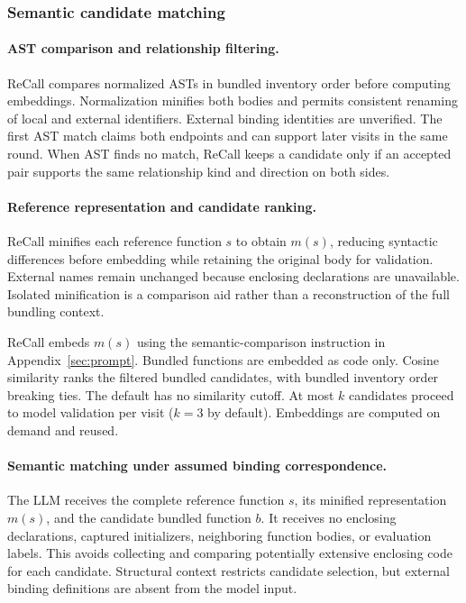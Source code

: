 \subsubsection{Semantic candidate matching}
\paragraph{AST comparison and relationship filtering.}
ReCall compares normalized ASTs in bundled inventory order before computing embeddings. Normalization minifies both bodies and permits consistent renaming of local and external identifiers. External binding identities are unverified. The first AST match claims both endpoints and can support later visits in the same round. When AST finds no match, ReCall keeps a candidate only if an accepted pair supports the same relationship kind and direction on both sides.

\paragraph{Reference representation and candidate ranking.}
ReCall minifies each reference function $s$ to obtain $m(s)$, reducing syntactic differences before embedding while retaining the original body for validation. External names remain unchanged because enclosing declarations are unavailable. Isolated minification is a comparison aid rather than a reconstruction of the full bundling context.

ReCall embeds $m(s)$ using the semantic-comparison instruction in Appendix~\ref{sec:prompt}. Bundled functions are embedded as code only. Cosine similarity ranks the filtered bundled candidates, with bundled inventory order breaking ties. The default has no similarity cutoff. At most $k$ candidates proceed to model validation per visit ($k=3$ by default). Embeddings are computed on demand and reused.

\paragraph{Semantic matching under assumed binding correspondence.}
The LLM receives the complete reference function $s$, its minified representation $m(s)$, and the candidate bundled function $b$. It receives no enclosing declarations, captured initializers, neighboring function bodies, or evaluation labels. This avoids collecting and comparing potentially extensive enclosing code for each candidate. Structural context restricts candidate selection, but external binding definitions are absent from the model input.

